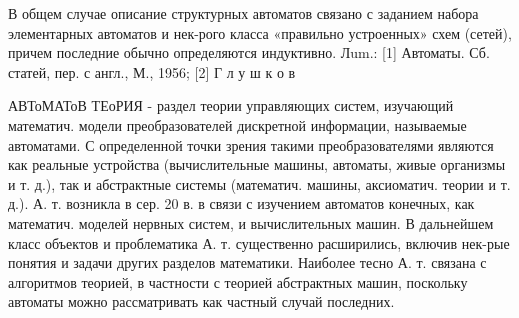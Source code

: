 \documentclass[10pt]{article}
\begin{document}
В общем случае описание структурных автоматов связано с заданием набора элементарных автоматов и нек-рого класса «правильно устроенных» схем (сетей), причем последние обычно определяются индуктивно. Лum.: [1] Автоматы. Сб. статей, пер. с англ., М., 1956; [2] Г л у ш к о в



АВТоМАТоВ ТЕоРИЯ - раздел теории управляющих систем, изучающий математич. модели преобразователей дискретной информации, называемые автоматами. С определенной точки зрения такими преобразователями являются как реальные устройства (вычислительные машины, автоматы, живые организмы и т. д.), так и абстрактные системы (математич. машины, аксиоматич. теории и т. д.). А. т. возникла в сер. 20 в. в связи с изучением автоматов конечных, как математич. моделей нервных систем, и вычислительных машин. В дальнейшем класс объектов и проблематика А. т. существенно расширились, включив нек-рые понятия и задачи других разделов математики. Наиболее тесно А. т. связана с алгоритмов теорией, в частности с теорией абстрактных машин, поскольку автоматы можно рассматривать как частный случай последних.
\end{document}
